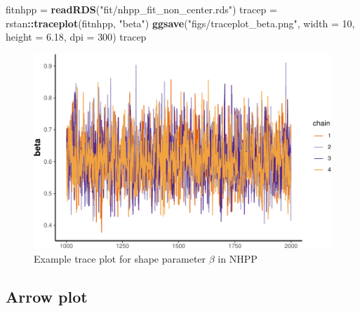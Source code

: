 \documentclass[]{article}
\newenvironment{Shaded}{\begin{snugshade}}{\end{snugshade}}
\newcommand{\DataTypeTok}[1]{\textcolor[rgb]{0.13,0.29,0.53}{#1}}
\newcommand{\DecValTok}[1]{\textcolor[rgb]{0.00,0.00,0.81}{#1}}
\newcommand{\FloatTok}[1]{\textcolor[rgb]{0.00,0.00,0.81}{#1}}
\newcommand{\KeywordTok}[1]{\textcolor[rgb]{0.13,0.29,0.53}{\textbf{#1}}}
\newcommand{\NormalTok}[1]{#1}
\newcommand{\OperatorTok}[1]{\textcolor[rgb]{0.81,0.36,0.00}{\textbf{#1}}}
\newcommand{\StringTok}[1]{\textcolor[rgb]{0.31,0.60,0.02}{#1}}
\begin{document}
\begin{Shaded}
\begin{Highlighting}[]
\NormalTok{fitnhpp =}\StringTok{ }\KeywordTok{readRDS}\NormalTok{(}\StringTok{"fit/nhpp_fit_non_center.rds"}\NormalTok{)}
\NormalTok{tracep =}\StringTok{ }\NormalTok{rstan}\OperatorTok{::}\KeywordTok{traceplot}\NormalTok{(fitnhpp, }\StringTok{"beta"}\NormalTok{)}
\KeywordTok{ggsave}\NormalTok{(}\StringTok{"figs/traceplot_beta.png"}\NormalTok{, }\DataTypeTok{width =} \DecValTok{10}\NormalTok{, }\DataTypeTok{height =} \FloatTok{6.18}\NormalTok{, }\DataTypeTok{dpi =} \DecValTok{300}\NormalTok{)}
\NormalTok{tracep}
\end{Highlighting}
\end{Shaded}

\begin{figure}
\centering
\includegraphics{02_Stats_models_files/figure-latex/exampletrace-1.pdf}
\caption{Example trace plot for shape parameter \(\beta\) in NHPP}
\end{figure}

\hypertarget{arrow-plot}{%
\subsection{Arrow plot}\label{arrow-plot}}
\end{document}
